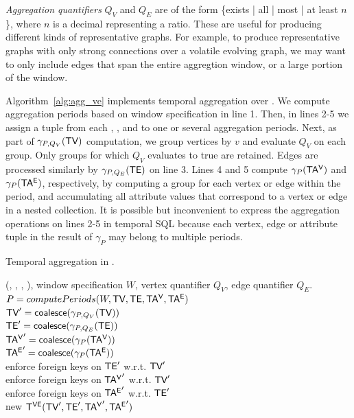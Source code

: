 {\em Aggregation quantifiers} $Q_V$ and $Q_E$ are of the form
\{exists | all | most | at least $n$ \}, where $n$ is a
decimal representing a ratio.  These are useful for producing
different kinds of representative graphs.  For example, to produce
representative graphs with only strong connections over a volatile
evolving graph, we may want to only include edges that span the entire
aggregtion window, or a large portion of the window.

Algorithm~\ref{alg:agg_ve} implements temporal aggregation over \tve.
We compute aggregation periods based on window specification in line
1.  Then, in lines 2-5 we assign a tuple from each \tv, \te, \tav and
\tae to one or several aggregation periods.  Next, as part of
$\gamma_{P,Q_V}(\textsf{TV})$ computation, we group vertices by $v$ and
evaluate $Q_V$ on each group.  Only groups for which $Q_V$ evaluates
to true are retained.  Edges are processed similarly by
$\gamma_{P,Q_E}(\textsf{TE})$ on line 3.  Lines 4 and 5 compute
$\gamma_{P}(\mathsf{TA^{V}})$ and $\gamma_{P}(\mathsf{TA^{E}})$, respectively, by computing
a group for each vertex or edge within the period, and accumulating
all attribute values that correspond to a vertex or edge in a nested
collection.  It is possible but inconvenient to express the
aggregation operations on lines 2-5 in temporal SQL because each
vertex, edge or attribute tuple in the result of $\gamma_{P}$ may
belong to multiple periods.

\begin{algorithm}[h!]
\caption{Temporal aggregation in \tve.}
\begin{algorithmic}[1]
\REQUIRE \tve (\tv, \te, \tav, \tae), window specification $W$, vertex quantifier $Q_V$, edge quantifier $Q_E$.\\
\STATE $P = computePeriods(W, \textsf{TV}, \textsf{TE}, \mathsf{TA^{V}}, \mathsf{TA^{E}})$\\
\STATE  $\textsf{TV}' = \textsf{coalesce} (\gamma_{P,Q_V}(\textsf{TV}))$\\
\STATE  $\textsf{TE}' = \textsf{coalesce} (\gamma_{P,Q_E}(\textsf{TE}))$\\
\STATE  $\mathsf{TA^{V}}' = \textsf{coalesce} (\gamma_{P}(\mathsf{TA^{V}}))$\\
\STATE  $\mathsf{TA^{E}}' = \textsf{coalesce} (\gamma_{P}(\mathsf{TA^{E}}))$\\
\STATE  enforce foreign keys on $\textsf{TE}'$ w.r.t. $\textsf{TV}'$\\
\STATE  enforce foreign keys on $\mathsf{TA^{V}}'$ w.r.t. $\textsf{TV}'$\\
\STATE  enforce foreign keys on $\mathsf{TA^{E}}'$ w.r.t. $\textsf{TE}'$\\
\RETURN new $\mathsf{T^{VE}} (\textsf{TV}', \textsf{TE}', \mathsf{TA^{V}}', \mathsf{TA^{E}}')$\\
\end{algorithmic}
\label{alg:agg_ve}
\end{algorithm}

